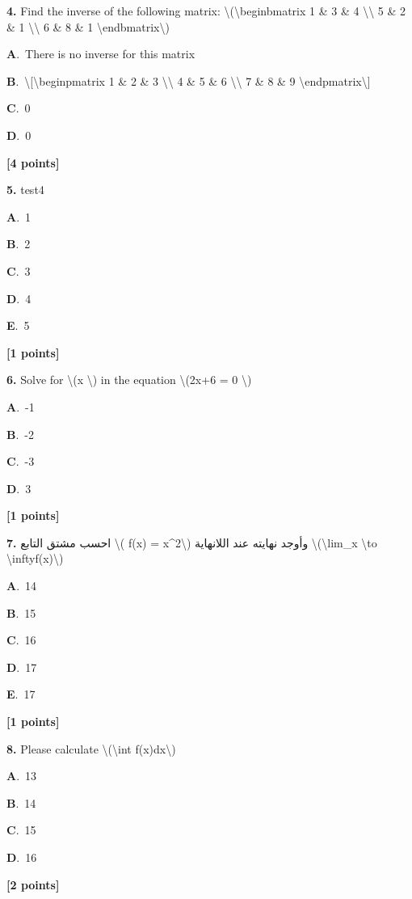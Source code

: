 \documentclass[12pt]{article}
\newcommand{\choice}[3]{%
  \noindent\textbf{#1}.~#2\hfill#3\par\vspace{0.25em}
}
\begin{document}
\noindent \textbf{\textenglish{4.}} {\textenglish{Find the inverse of the following matrix: \textbackslash{}(\textbackslash{}begin{bmatrix} 1 \& 3 \& 4 \textbackslash{}\textbackslash{} 5 \& 2 \& 1 \textbackslash{}\textbackslash{} 6 \& 8 \& 1 \textbackslash{}end{bmatrix}\textbackslash{})}}

\noindent\choice{A}{{\textenglish{There is no inverse for this matrix}}}{}
\noindent\choice{B}{{\textenglish{\textbackslash{}[\textbackslash{}begin{pmatrix} 1 \& 2 \& 3 \textbackslash{}\textbackslash{} 4 \& 5 \& 6 \textbackslash{}\textbackslash{} 7 \& 8 \& 9  \textbackslash{}end{pmatrix}\textbackslash{}]}}}{}
\noindent\choice{C}{{\textenglish{0}}}{}
\noindent\choice{D}{{\textenglish{0}}}{}
\hfill \textbf{[4 points]}\vspace{0.5em}

\noindent \textbf{\textenglish{5.}} {\textenglish{test4}}

\noindent\choice{A}{{\textenglish{1}}}{}
\noindent\choice{B}{{\textenglish{2}}}{}
\noindent\choice{C}{{\textenglish{3}}}{}
\noindent\choice{D}{{\textenglish{4}}}{}
\noindent\choice{E}{{\textenglish{5}}}{}
\hfill \textbf{[1 points]}\vspace{0.5em}

\noindent \textbf{\textenglish{6.}} {\textenglish{Solve for \textbackslash{}(x \textbackslash{}) in the equation \textbackslash{}(2x+6 = 0 \textbackslash{})}}

\noindent\choice{A}{{\textenglish{-1}}}{}
\noindent\choice{B}{{\textenglish{-2}}}{}
\noindent\choice{C}{{\textenglish{-3}}}{}
\noindent\choice{D}{{\textenglish{3}}}{}
\hfill \textbf{[1 points]}\vspace{0.5em}

\noindent \textbf{\textenglish{7.}} {\textarabic{احسب مشتق التابع \textbackslash{}( f(x) = x\^{}2\textbackslash{}) وأوجد نهايته عند اللانهاية \textbackslash{}(\textbackslash{}lim\_{x \textbackslash{}to \textbackslash{}infty}f(x)\textbackslash{})}}

\noindent\choice{A}{{\textenglish{14}}}{}
\noindent\choice{B}{{\textenglish{15}}}{}
\noindent\choice{C}{{\textenglish{16}}}{}
\noindent\choice{D}{{\textenglish{17}}}{}
\noindent\choice{E}{{\textenglish{17}}}{}
\hfill \textbf{[1 points]}\vspace{0.5em}

\noindent \textbf{\textenglish{8.}} {\textenglish{Please calculate \textbackslash{}(\textbackslash{}int f(x)dx\textbackslash{})}}

\noindent\choice{A}{{\textenglish{13}}}{}
\noindent\choice{B}{{\textenglish{14}}}{}
\noindent\choice{C}{{\textenglish{15}}}{}
\noindent\choice{D}{{\textenglish{16}}}{}
\hfill \textbf{[2 points]}\vspace{0.5em}
\end{document}
